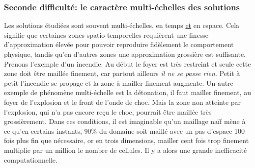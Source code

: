     \subsubsection{Seconde difficulté: le caractère multi-échelles des solutions}
        Les solutions étudiées sont souvent multi-échelles, en temps \underline{et} en espace. Cela signifie que certaines zones spatio-temporelles requièrent
        une finesse d'approximation élevée pour pouvoir reproduire fidèlement le comportement physique, tandis qu'en d'autres zones une approximation
        grossière est suffisante. Prenons l'exemple d'un incendie. Au début le foyer est très restreint et seule cette zone doit être maillée finement, 
        car partout ailleurs \textit{il ne se passe rien}. Petit à petit l'incendie se propage et la zone à mailler finement augmente. Un autre exemple de phénomène 
        multi-échelle est la détonation, il faut mailler finement, au foyer de l'explosion et le front de l'onde de choc. Mais la zone non atteinte par l'explosion, 
        qui n'a pas encore reçu le choc, pourrait être maillée très grossièrement. 
        Dans ces conditions, il est imaginable qu'un maillage naïf mène à ce qu'en certains instants, 90\% du domaine soit maillé avec un pas d'espace 100 fois plus fin que nécessaire,
        or en trois dimensions, mailler cent fois trop finement multiplie par un million le nombre de cellules.
        Il y a alors une grande inefficacité computationnelle.



